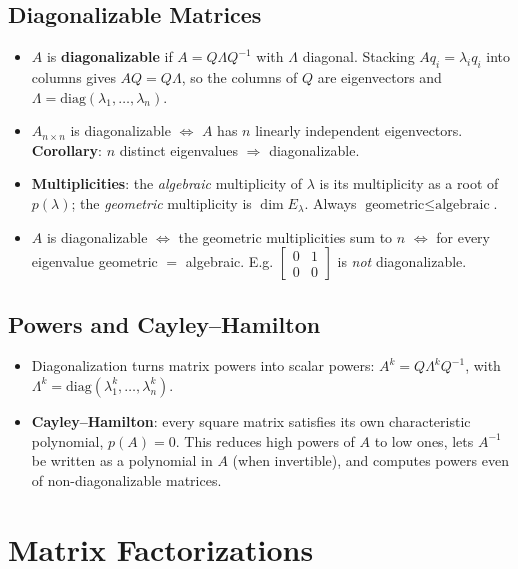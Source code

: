 \documentclass[hidelinks]{article}
\begin{document}
\subsection{Diagonalizable Matrices}
\begin{itemize}
    \item $A$ is \textbf{diagonalizable} if $A = Q\Lambda Q^{-1}$ with $\Lambda$ diagonal. Stacking $Aq_i = \lambda_i q_i$ into columns gives $AQ = Q\Lambda$, so the columns of $Q$ are eigenvectors and $\Lambda = \mathrm{diag}(\lambda_1,\ldots,\lambda_n)$.
    \item $A_{n\times n}$ is diagonalizable $\iff$ $A$ has $n$ linearly independent eigenvectors. \textbf{Corollary}: $n$ distinct eigenvalues $\Rightarrow$ diagonalizable.
    \item \textbf{Multiplicities}: the \emph{algebraic} multiplicity of $\lambda$ is its multiplicity as a root of $p(\lambda)$; the \emph{geometric} multiplicity is $\dim E_\lambda$. Always $\text{geometric} \le \text{algebraic}$.
    \item $A$ is diagonalizable $\iff$ the geometric multiplicities sum to $n$ $\iff$ for every eigenvalue geometric $=$ algebraic. E.g. $\begin{bmatrix}0&1\\0&0\end{bmatrix}$ is \emph{not} diagonalizable.
\end{itemize}

\subsection{Powers and Cayley--Hamilton}
\begin{itemize}
    \item Diagonalization turns matrix powers into scalar powers: $A^k = Q\Lambda^k Q^{-1}$, with $\Lambda^k = \mathrm{diag}(\lambda_1^k,\ldots,\lambda_n^k)$.
    \item \textbf{Cayley--Hamilton}: every square matrix satisfies its own characteristic polynomial, $p(A) = 0$. This reduces high powers of $A$ to low ones, lets $A^{-1}$ be written as a polynomial in $A$ (when invertible), and computes powers even of non-diagonalizable matrices.
\end{itemize}

\section{Matrix Factorizations}
\end{document}
